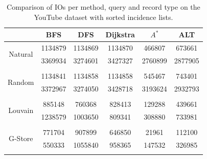 \begin{table}[H]
	\begin{center}
		 \begin{tabular}[c]{c c c c c c} \toprule
			  & BFS & DFS & Dijkstra & $A^*$  & ALT \\ \midrule 
 			\multirow{2}{*}{Natural}  & 1134879 & 1134869 & 1134870 & 466807 & 673661 \\ 
 				 & 3369934 & 3274601 & 3427327 & 2760899 & 2877905 \\ 
 				&&&&& \\[-0.5em]
 			\multirow{2}{*}{Random}  & 1134841 & 1134858 & 1134858 & 545467 & 743401 \\ 
 				 & 3372967 & 3274050 & 3428718 & 3193624 & 2932793 \\ 
 				&&&&& \\[-0.5em]
 			\multirow{2}{*}{Louvain}  & 885148 & 760368 & 828413 & 129288 & 439661 \\ 
 				 & 1238579 & 1003650 & 809341 & 308880 & 733981 \\ 
 				&&&&& \\[-0.5em]
 			\multirow{2}{*}{G-Store}  & 771704 & 907899 & 646850 & 21961 & 112100 \\ 
 				 & 550333 & 1055840 & 958365 & 147532 & 326985 \\ 
 				&&&&& \\[-0.5em]
 					\end{tabular}  
  	 \end{center}
	 \caption{Comparison of IOs per method, query and record type on the YouTube dataset with sorted incidence lists.}
	 \label{yt-s}
\end{table}

